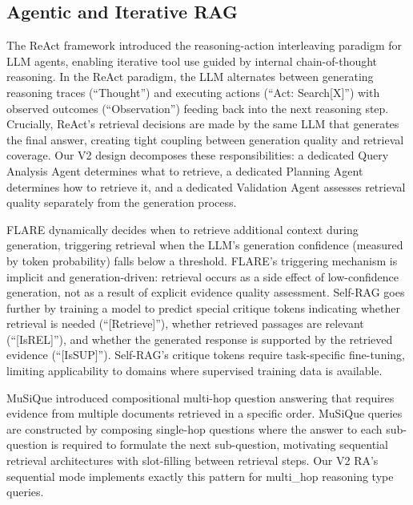 \documentclass[11pt, a4paper]{article}
\begin{document}
\subsection{Agentic and Iterative RAG}

The ReAct framework \citep{yao2023react} introduced the reasoning-action interleaving paradigm for LLM agents, enabling iterative tool use guided by internal chain-of-thought reasoning. In the ReAct paradigm, the LLM alternates between generating reasoning traces (``Thought'') and executing actions (``Act: Search[X]'') with observed outcomes (``Observation'') feeding back into the next reasoning step. Crucially, ReAct's retrieval decisions are made by the same LLM that generates the final answer, creating tight coupling between generation quality and retrieval coverage. Our V2 design decomposes these responsibilities: a dedicated Query Analysis Agent determines what to retrieve, a dedicated Planning Agent determines how to retrieve it, and a dedicated Validation Agent assesses retrieval quality separately from the generation process.

FLARE \citep{ji2023flare} dynamically decides when to retrieve additional context during generation, triggering retrieval when the LLM's generation confidence (measured by token probability) falls below a threshold. FLARE's triggering mechanism is implicit and generation-driven: retrieval occurs as a side effect of low-confidence generation, not as a result of explicit evidence quality assessment. Self-RAG \citep{asai2024selfrag} goes further by training a model to predict special critique tokens indicating whether retrieval is needed (``[Retrieve]''), whether retrieved passages are relevant (``[IsREL]''), and whether the generated response is supported by the retrieved evidence (``[IsSUP]''). Self-RAG's critique tokens require task-specific fine-tuning, limiting applicability to domains where supervised training data is available.

MuSiQue \citep{trivedi2022musique} introduced compositional multi-hop question answering that requires evidence from multiple documents retrieved in a specific order. MuSiQue queries are constructed by composing single-hop questions where the answer to each sub-question is required to formulate the next sub-question, motivating sequential retrieval architectures with slot-filling between retrieval steps. Our V2 RA's sequential mode implements exactly this pattern for multi\_hop reasoning type queries.
\end{document}
